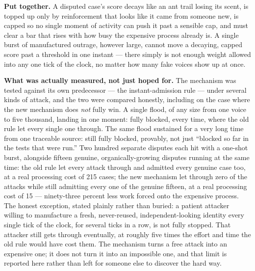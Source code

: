 \documentclass[11pt]{article}
\begin{document}
\textbf{Put together.} A disputed case's score decays like an ant trail
losing its scent, is topped up only by reinforcement that looks like it
came from someone new, is capped so no single moment of activity can
push it past a sensible cap, and must clear a bar that rises with how
busy the expensive process already is. A single burst of manufactured
outrage, however large, cannot move a decaying, capped score past a
threshold in one instant --- there simply is not enough weight allowed
into any one tick of the clock, no matter how many fake voices show up
at once.

\textbf{What was actually measured, not just hoped for.} The mechanism
was tested against its own predecessor --- the instant-admission rule
--- under several kinds of attack, and the two were compared honestly,
including on the case where the new mechanism does \emph{not} fully
win. A single flood, of any size from one voice to five thousand,
landing in one moment: fully blocked, every time, where the old rule let
every single one through. The same flood sustained for a very long time
from one traceable source: still fully blocked, provably, not just
``blocked so far in the tests that were run.'' Two hundred separate
disputes each hit with a one-shot burst, alongside fifteen genuine,
organically-growing disputes running at the same time: the old rule let
every attack through and admitted every genuine case too, at a real
processing cost of 215 cases; the new mechanism let through zero of the
attacks while still admitting every one of the genuine fifteen, at a
real processing cost of 15 --- ninety-three percent less work forced
onto the expensive process. The honest exception, stated plainly rather
than buried: a patient attacker willing to manufacture a fresh,
never-reused, independent-looking identity every single tick of the
clock, for several ticks in a row, is not fully stopped. That attacker
still gets through eventually, at roughly five times the effort and time
the old rule would have cost them. The mechanism turns a free attack
into an expensive one; it does not turn it into an impossible one, and
that limit is reported here rather than left for someone else to
discover the hard way.
\end{document}
